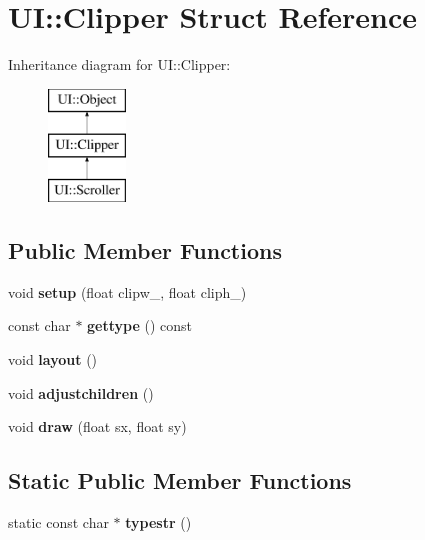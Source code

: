 \hypertarget{struct_u_i_1_1_clipper}{}\section{UI\+:\+:Clipper Struct Reference}
\label{struct_u_i_1_1_clipper}
Inheritance diagram for UI\+:\+:Clipper\+:\begin{figure}[H]
\begin{center}
\leavevmode
\includegraphics[height=3.000000cm]{struct_u_i_1_1_clipper}
\end{center}
\end{figure}
\subsection*{Public Member Functions}
\begin{DoxyCompactItemize}
\item 
\mbox{\label{struct_u_i_1_1_clipper_a01aa2c0e342b6ee3475d6399d1ced702}} 
void {\bfseries setup} (float clipw\+\_, float cliph\+\_)
\item 
\mbox{\label{struct_u_i_1_1_clipper_ab5dfb3bd4658b90aa5412c987f3b94d2}} 
const char $\ast$ {\bfseries gettype} () const
\item 
\mbox{\label{struct_u_i_1_1_clipper_ab84172239e9111d89a49ee6d18d8e82e}} 
void {\bfseries layout} ()
\item 
\mbox{\label{struct_u_i_1_1_clipper_ad39ee9c566a6efa93e03d23eaaef5be3}} 
void {\bfseries adjustchildren} ()
\item 
\mbox{\label{struct_u_i_1_1_clipper_ac555c1baecc5c6adba4ab0ae5044eb27}} 
void {\bfseries draw} (float sx, float sy)
\end{DoxyCompactItemize}
\subsection*{Static Public Member Functions}
\begin{DoxyCompactItemize}
\item 
\mbox{\label{struct_u_i_1_1_clipper_a486295deee4091b1c6820f33f9f96411}} 
static const char $\ast$ {\bfseries typestr} ()
\end{DoxyCompactItemize}
